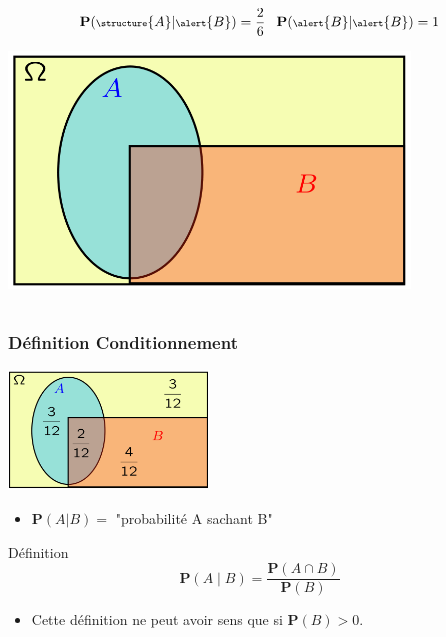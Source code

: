 \documentclass{beamer}
\begin{document}
\begin{frame}[t]
\begin{columns}
\begin{column}{0.5\textwidth}
{        $$
        \scriptsize
        \mathbf{P}(\structure{A} | \alert{B}) =  \frac{2}{6}\quad
        \mathbf{P}(\alert{B} | \alert{B} ) =  1
        $$
}

{
        \centering
        \includegraphics[width=0.8\textwidth]{./cond_first_example_1_4.png}

}
        \end{column}
    \end{columns}
    
\end{frame}
\begin{frame}[t]
    \frametitle{Définition Conditionnement}
    \begin{center}
    \includegraphics[width=0.4\textwidth]{./cond_first_example_1_3.png}
    \end{center}
    
    \pause
    \begin{itemize}
        \item $\mathbf{P}(A | B) =$ "\scriptsize probabilité A sachant B"
    \end{itemize}
    \begin{block}{Définition}
       \begin{equation}
          \mathbf{P}(A\;|\; B) = \dfrac{\mathbf{P}(A\cap B)}{\mathbf{P}(B)}
       \end{equation} 
    \end{block}
    \begin{itemize}
        \item Cette définition ne peut avoir sens que si $\mathbf{P}(B) > 0 $.
    \end{itemize}
\end{frame}
\end{document}
